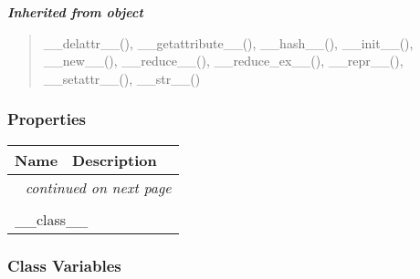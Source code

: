 \large{\textbf{\textit{Inherited from object}}}

\begin{quote}
\_\_delattr\_\_(), \_\_getattribute\_\_(), \_\_hash\_\_(), \_\_init\_\_(), \_\_new\_\_(), \_\_reduce\_\_(), \_\_reduce\_ex\_\_(), \_\_repr\_\_(), \_\_setattr\_\_(), \_\_str\_\_()
\end{quote}


  \subsubsection{Properties}

    \vspace{-1cm}
\hspace{\varindent}\begin{longtable}{|p{\varnamewidth}|p{\vardescrwidth}|l}
\cline{1-2}
\cline{1-2} \centering \textbf{Name} & \centering \textbf{Description}& \\
\cline{1-2}
\endhead\cline{1-2}\multicolumn{3}{r}{\small\textit{continued on next page}}\\\endfoot\cline{1-2}
\endlastfoot\multicolumn{2}{|l|}{\textit{Inherited from object}}\\
\multicolumn{2}{|p{\varwidth}|}{\raggedright \_\_class\_\_}\\
\cline{1-2}
\end{longtable}



  \subsubsection{Class Variables}

